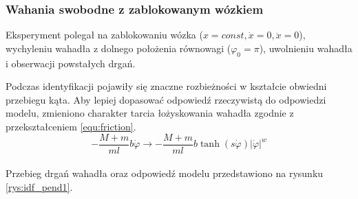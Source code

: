 \documentclass[12pt]{article}
\begin{document}
\subsubsection{Wahania swobodne z zablokowanym wózkiem}

Eksperyment polegał na zablokowaniu wózka ($x = const,\dot{x} = 0,
\ddot{x} = 0$), wychyleniu wahadła z dolnego położenia równowagi
($\varphi_0=\pi$), uwolnieniu wahadła i obserwacji powstałych drgań.

Podczas identyfikacji pojawiły się znaczne rozbieżności w kształcie obwiedni
przebiegu kąta. Aby lepiej dopasować odpowiedź rzeczywistą do odpowiedzi modelu,
zmieniono charakter tarcia łożyskowania wahadła zgodnie z przekształceniem
\eqref{equ:friction}.\\

\begin{equation}
    -\frac{M+m}{ml}b\dot{\varphi} \rightarrow
    -\frac{M+m}{ml}b\tanh(s\dot{\varphi})|\dot{\varphi}|^w
    \label{equ:friction}
\end{equation}\\

Przebieg drgań wahadła oraz odpowiedź modelu przedstawiono na rysunku
\ref{rys:idf_pend1}.
\end{document}
